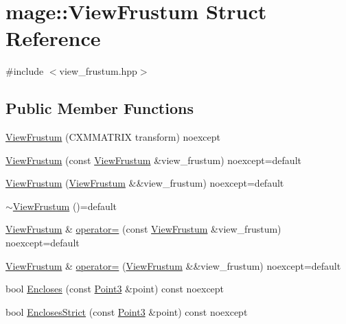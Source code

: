 \hypertarget{structmage_1_1_view_frustum}{}\section{mage\+:\+:View\+Frustum Struct Reference}
\label{structmage_1_1_view_frustum}


{\ttfamily \#include $<$view\+\_\+frustum.\+hpp$>$}

\subsection*{Public Member Functions}
\begin{DoxyCompactItemize}
\item 
\hyperlink{structmage_1_1_view_frustum_a8c3f1791977a5b53b81b544fc6748622}{View\+Frustum} (C\+X\+M\+M\+A\+T\+R\+IX transform) noexcept
\item 
\hyperlink{structmage_1_1_view_frustum_a1c8ce91aa113c84ae76bcce818bf8cb3}{View\+Frustum} (const \hyperlink{structmage_1_1_view_frustum}{View\+Frustum} \&view\+\_\+frustum) noexcept=default
\item 
\hyperlink{structmage_1_1_view_frustum_a03781189c576035b6cafa0bc7789e39f}{View\+Frustum} (\hyperlink{structmage_1_1_view_frustum}{View\+Frustum} \&\&view\+\_\+frustum) noexcept=default
\item 
\hyperlink{structmage_1_1_view_frustum_aaa0e10f5401370909694e923c58323a9}{$\sim$\+View\+Frustum} ()=default
\item 
\hyperlink{structmage_1_1_view_frustum}{View\+Frustum} \& \hyperlink{structmage_1_1_view_frustum_a602d2a95ae31c253bf2017b957e47f4c}{operator=} (const \hyperlink{structmage_1_1_view_frustum}{View\+Frustum} \&view\+\_\+frustum) noexcept=default
\item 
\hyperlink{structmage_1_1_view_frustum}{View\+Frustum} \& \hyperlink{structmage_1_1_view_frustum_a117dd9f3b6c3c80607aa34ee012a7a3a}{operator=} (\hyperlink{structmage_1_1_view_frustum}{View\+Frustum} \&\&view\+\_\+frustum) noexcept=default
\item 
bool \hyperlink{structmage_1_1_view_frustum_a68e7b7915505d42de255ffb37b4beba3}{Encloses} (const \hyperlink{structmage_1_1_point3}{Point3} \&point) const noexcept
\item 
bool \hyperlink{structmage_1_1_view_frustum_ab0df90a890172361fb520d4527d81546}{Encloses\+Strict} (const \hyperlink{structmage_1_1_point3}{Point3} \&point) const noexcept
\item 

\end{DoxyCompactItemize}
